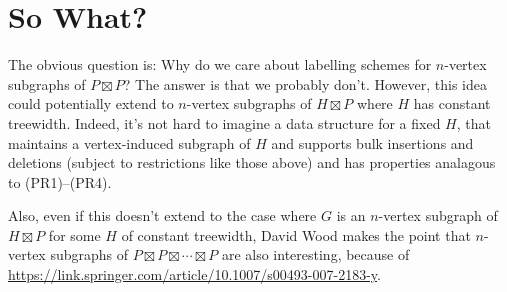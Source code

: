 \documentclass[kpfonts]{patmorin}
\begin{document}
\section{So What?}

The obvious question is: Why do we care about labelling schemes for $n$-vertex subgraphs of $P\boxtimes P$? The answer is that we probably don't.  However, this idea could potentially extend to $n$-vertex subgraphs of $H\boxtimes P$ where $H$ has constant treewidth.  Indeed, it's not hard to imagine a data structure for a fixed $H$, that maintains a vertex-induced subgraph of $H$ and supports bulk insertions and deletions (subject to restrictions like those above) and has properties analagous to (PR1)--(PR4).

Also, even if this doesn't extend to the case where $G$ is an $n$-vertex subgraph of $H\boxtimes P$ for some $H$ of constant treewidth, David Wood makes the point that $n$-vertex subgraphs of $P\boxtimes P\boxtimes\cdots\boxtimes P$ are also interesting, because of \url{https://link.springer.com/article/10.1007/s00493-007-2183-y}.









% 
% 
% 
% 
% 
\end{document}
